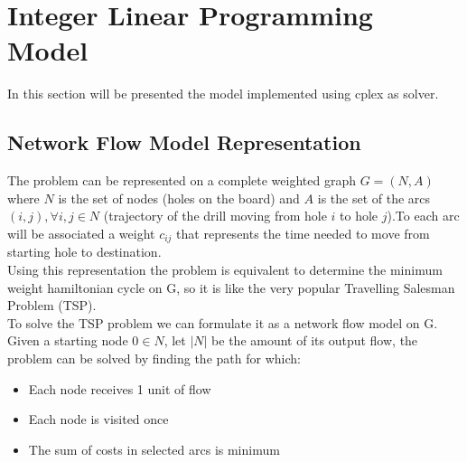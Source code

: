 \section{Integer Linear Programming Model}
	In this section will be presented the model implemented using cplex as solver.
	\subsection{Network Flow Model Representation}
		The problem can be represented on a complete weighted graph $G=(N, A)$ where $N$ is the set of nodes (holes on the board) and $A$ is the set of the arcs $(i, j), ∀ i, j ∈ N$ (trajectory of the drill moving from hole $i$ to hole $j$).To each arc will be associated a weight $c_{ij}$ that represents the time needed to move from starting hole to destination.\\
		Using this representation the problem is equivalent to determine the minimum weight hamiltonian cycle on G, so it is like the very popular Travelling Salesman Problem (TSP).\\
		To solve the TSP problem we can formulate it as a network flow model on G. Given a starting node $0 ∈ N$, let $|N|$ be the amount of its output flow, the problem can be solved by finding the path for which:
		\begin{itemize}
			\item Each node receives 1 unit of flow
			\item Each node is visited once
			\item The sum of costs in selected arcs is minimum
		\end{itemize}
		
